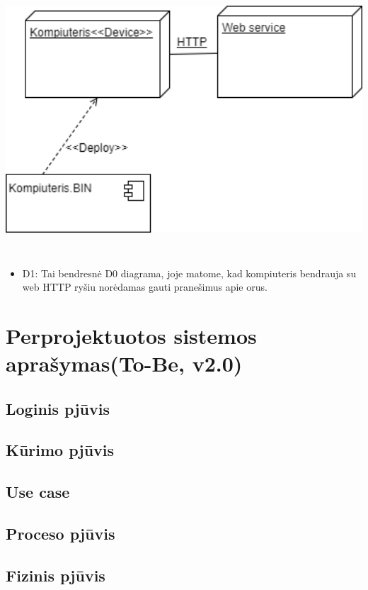 ﻿\documentclass[oneside]{VUMIFPSkursinis}
\begin{document}
	\includegraphics[width=15cm,height=10cm]{Deployment0.png}
	\begin{itemize}
		\item D1: Tai bendresnė D0 diagrama, joje matome, kad kompiuteris bendrauja su web HTTP ryšiu norėdamas gauti pranešimus apie orus.
	\end{itemize}

\section{Perprojektuotos sistemos aprašymas(To-Be, v2.0)}

\subsection{Loginis pjūvis}
\subsection{Kūrimo pjūvis}
\subsection{Use case}
\subsection{Proceso pjūvis}
\subsection{Fizinis pjūvis}



\end{document}
